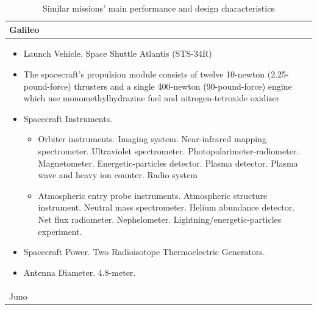 \begin{longtable}{p{\textwidth}}
  \caption{Similar missions' main performance and design
    characteristics} \\ \toprule

  Galileo \\* \midrule

  \begin{itemize}
  \item Launch Vehicle. Space Shuttle Atlantis (STS-34R)
  \item The spacecraft's propulsion module consists of twelve
    10-newton (2.25-pound-force) thrusters and a single 400-newton
    (90-pound-force) engine which use monomethylhydrazine fuel and
    nitrogen-tetroxide oxidizer
  \item Spacecraft Instruments.
    \begin{itemize}
    \item Orbiter instruments. Imaging system. Near-infrared mapping
      spectrometer. Ultraviolet spectrometer.
      Photopolarimeter-radiometer. Magnetometer. Energetic-particles
      detector. Plasma detector. Plasma wave and heavy ion
      counter. Radio system
    \item Atmospheric entry probe instruments. Atmospheric structure
      instrument.  Neutral mass spectrometer. Helium abundance
      detector. Net flux
      radiometer. Nephelometer. Lightning/energetic-particles
      experiment.
    \end{itemize}
  \item Spacecraft Power. Two Radioisotope Thermoelectric Generators.
  \item Antenna Diameter. 4.8-meter.
  \end{itemize} \\

  Juno \\* \midrule


\end{longtable}
